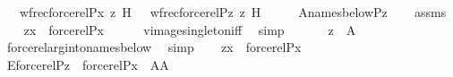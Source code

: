 \begin{isabellebody}
\ \ \ {\isachardoublequoteopen}wfrec{\isacharparenleft}{\kern0pt}forcerel{\isacharparenleft}{\kern0pt}P{\isacharcomma}{\kern0pt}x{\isacharparenright}{\kern0pt}{\isacharcomma}{\kern0pt}\ z{\isacharcomma}{\kern0pt}\ H{\isacharparenright}{\kern0pt}\ {\isacharequal}{\kern0pt}\ \ wfrec{\isacharparenleft}{\kern0pt}forcerel{\isacharparenleft}{\kern0pt}P{\isacharcomma}{\kern0pt}z{\isacharparenright}{\kern0pt}{\isacharcomma}{\kern0pt}\ z{\isacharcomma}{\kern0pt}\ H{\isacharparenright}{\kern0pt}{\isachardoublequoteclose}\isanewline
%
\isadelimproof
%
\endisadelimproof
%
\isatagproof
{}\isamarkupfalse%
\ {\isacharminus}{\kern0pt}\isanewline
\ \ \isamarkupfalse%
\ {\isacharquery}{\kern0pt}A{\isacharequal}{\kern0pt}{\isachardoublequoteopen}names{\isacharunderscore}{\kern0pt}below{\isacharparenleft}{\kern0pt}P{\isacharcomma}{\kern0pt}z{\isacharparenright}{\kern0pt}{\isachardoublequoteclose}\isanewline
\ \ \isamarkupfalse%
\ assms\isanewline
\ \ \isamarkupfalse%
\ {\isachardoublequoteopen}{\isasymlangle}z{\isacharcomma}{\kern0pt}x{\isasymrangle}\ {\isasymin}\ forcerel{\isacharparenleft}{\kern0pt}P{\isacharcomma}{\kern0pt}x{\isacharparenright}{\kern0pt}{\isachardoublequoteclose}\isanewline
\ \ \ \ \isamarkupfalse%
\ vimage{\isacharunderscore}{\kern0pt}singleton{\isacharunderscore}{\kern0pt}iff\ \isamarkupfalse%
\ simp\isanewline
\ \ \isamarkupfalse%
\isanewline
\ \ \isamarkupfalse%
\ {\isachardoublequoteopen}z\ {\isasymin}\ {\isacharquery}{\kern0pt}A{\isachardoublequoteclose}\isanewline
\ \ \ \ \isamarkupfalse%
\ forcerel{\isacharunderscore}{\kern0pt}arg{\isacharunderscore}{\kern0pt}into{\isacharunderscore}{\kern0pt}names{\isacharunderscore}{\kern0pt}below\ \isamarkupfalse%
\ simp\isanewline
\ \ \isamarkupfalse%
\ {\isacartoucheopen}{\isasymlangle}z{\isacharcomma}{\kern0pt}x{\isasymrangle}\ {\isasymin}\ forcerel{\isacharparenleft}{\kern0pt}P{\isacharcomma}{\kern0pt}x{\isacharparenright}{\kern0pt}{\isacartoucheclose}\isanewline
\ \ \isamarkupfalse%
\ E{\isacharcolon}{\kern0pt}{\isachardoublequoteopen}forcerel{\isacharparenleft}{\kern0pt}P{\isacharcomma}{\kern0pt}z{\isacharparenright}{\kern0pt}\ {\isacharequal}{\kern0pt}\ forcerel{\isacharparenleft}{\kern0pt}P{\isacharcomma}{\kern0pt}x{\isacharparenright}{\kern0pt}\ {\isasyminter}\ {\isacharparenleft}{\kern0pt}{\isacharquery}{\kern0pt}A{\isasymtimes}{\isacharquery}{\kern0pt}A{\isacharparenright}{\kern0pt}{\isachardoublequoteclose}\isanewline

\end{isabellebody}

